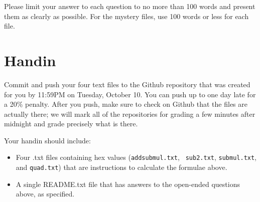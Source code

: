 \documentclass{article}
\begin{document}
Please limit your answer to each question to no more than 100 words and present
them as clearly as possible. For the mystery files, use 100 words or less for
each file.

\section{Handin}

Commit and push your four text files to the Github repository that was created
for you by 11:59PM on Tuesday, October 10. You can push up to one day late for
a 20\% penalty. After you push, make sure to check on Github that the files are
actually there; we will mark all of the repositories for grading a few minutes
after midnight and grade precisely what is there.

Your handin should include:

\begin{itemize}
\item Four .txt files containing hex values ({\tt addsubmul.txt}, {\tt
sub2.txt}, {\tt submul.txt}, and {\tt quad.txt}) that are instructions to
calculate the formulae above.
\item A single README.txt file that has answers to the open-ended questions
above, as specified.
\end{itemize}
\end{document}
